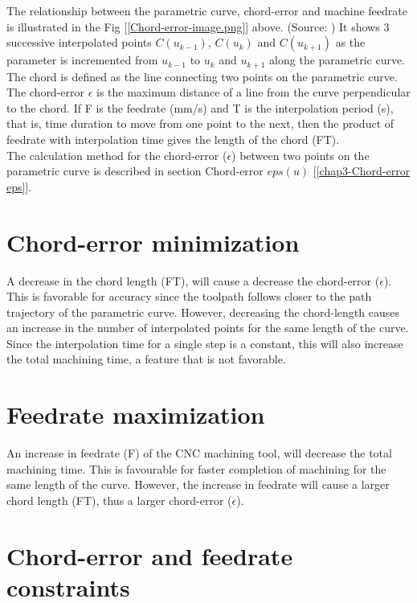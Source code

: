 The relationship between the parametric curve, chord-error and machine feedrate is illustrated in the Fig [\ref{Chord-error-image.png}] above. (Source: \cite{Zhong-etal:2018}) It shows 3 successive interpolated points $C(u_{k-1})$, $C(u_{k})$ and $C(u_{k+1})$ as the parameter is incremented from $u_{k-1}$ to  $u_{k}$ and  $u_{k+1}$ along the parametric curve. \\

The chord is defined as the line connecting two points on the parametric curve. The chord-error $\epsilon$ is the maximum distance of a line from the curve perpendicular to the chord. If F is the feedrate (mm/s) and T is the interpolation period (s), that is, time duration to move from one point to the next, then the product of feedrate with interpolation time gives the length of the chord (FT).\\

The calculation method for the chord-error ($\epsilon$) between two points on the parametric curve is described in section Chord-error $eps(u)$ [\ref{chap3-Chord-error eps}].

\section{Chord-error minimization}

A decrease in the chord length (FT), will cause a decrease the chord-error ($\epsilon$). This is favorable for accuracy since the toolpath follows closer to the path trajectory of the parametric curve. However, decreasing the chord-length causes an increase in the number of interpolated points for the same length of the curve. Since the interpolation time for a single step is a constant, this will also increase the total machining time, a feature that is not favorable. 
 
\section{Feedrate maximization}

An increase in feedrate (F) of the CNC machining tool, will decrease the total machining time. This is favourable for faster completion of machining for the same length of the curve. However, the increase in feedrate will cause a larger chord length (FT), thus a larger chord-error ($\epsilon$).

\section{Chord-error and feedrate constraints}

